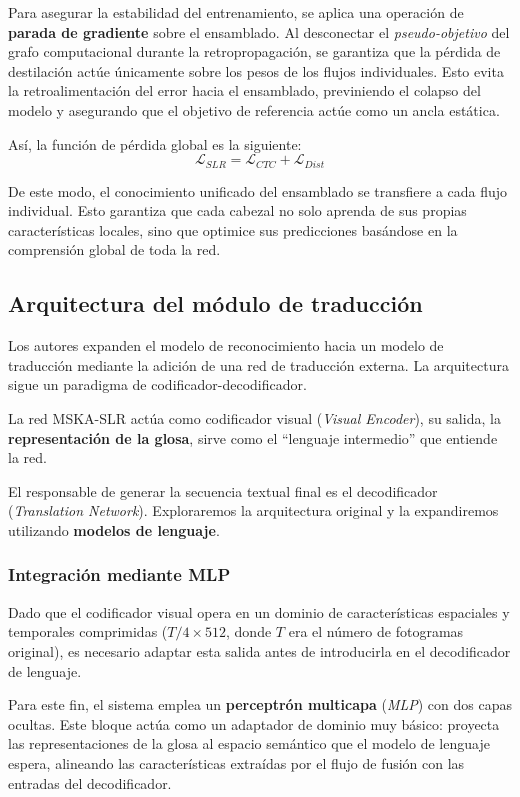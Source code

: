 Para asegurar la estabilidad del entrenamiento, se aplica una operación de \textbf{parada de gradiente} sobre el ensamblado.
Al desconectar el \textit{pseudo-objetivo} del grafo computacional durante la retropropagación, se garantiza que la pérdida de destilación actúe únicamente sobre los pesos de los flujos individuales.
Esto evita la retroalimentación del error hacia el ensamblado, previniendo el colapso del modelo y asegurando que el objetivo de referencia actúe como un ancla estática.

Así, la función de pérdida global es la siguiente:
\begin{equation*}
    \mathcal{L}_{SLR} = \mathcal{L}_{CTC} + \mathcal{L}_{Dist}
\end{equation*}

De este modo, el conocimiento unificado del ensamblado se transfiere a cada flujo individual.
Esto garantiza que cada cabezal no solo aprenda de sus propias características locales, sino que optimice sus predicciones basándose en la comprensión global de toda la red.


\subsection{Arquitectura del módulo de traducción}
Los autores expanden el modelo de reconocimiento hacia un modelo de traducción mediante la adición de una red de traducción externa.
La arquitectura sigue un paradigma de codificador-decodificador.

La red MSKA-SLR actúa como codificador visual (\textit{Visual Encoder}), su salida, la \textbf{representación de la glosa}, sirve como el ``lenguaje intermedio'' que entiende la red.

El responsable de generar la secuencia textual final es el decodificador (\textit{Translation Network}).
Exploraremos la arquitectura original y la expandiremos utilizando \textbf{modelos de lenguaje}.

\subsubsection{Integración mediante MLP}
Dado que el codificador visual opera en un dominio de características espaciales y temporales comprimidas ($T/4 \times 512$, donde $T$ era el número de fotogramas original), es necesario adaptar esta salida antes de introducirla en el decodificador de lenguaje.

Para este fin, el sistema emplea un \textbf{perceptrón multicapa} (\textit{MLP}) con dos capas ocultas.
Este bloque actúa como un adaptador de dominio muy básico: proyecta las representaciones de la glosa al espacio semántico que el modelo de lenguaje espera, alineando las características extraídas por el flujo de fusión con las entradas del decodificador.


